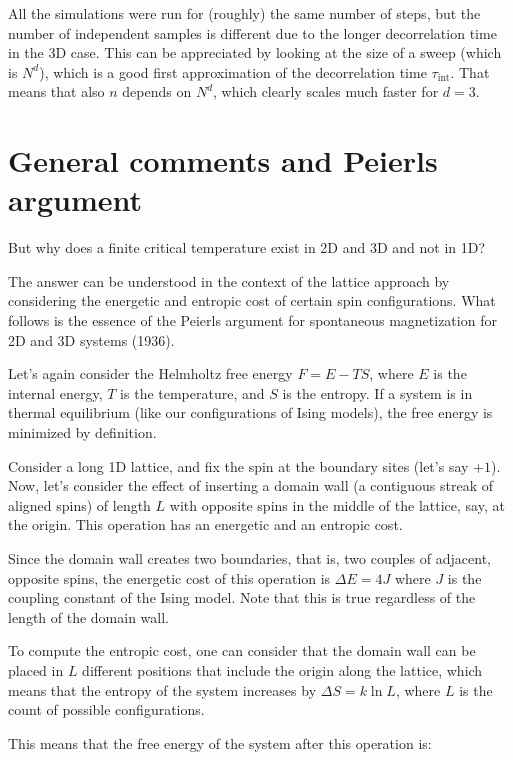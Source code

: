 All the simulations were run for (roughly) the same number of steps, but the number of independent samples is different due to the longer decorrelation time in the 3D case. This can be appreciated by looking at the size of a sweep (which is $N^d$), which is a good first approximation of the decorrelation time $\tau_{\text{int}}$. That means that also $n$ depends on $N^d$, which clearly scales much faster for $d = 3$.

\FloatBarrier

\section{General comments and Peierls argument}

But why does a finite critical temperature exist in 2D and 3D and not in 1D?

The answer can be understood in the context of the lattice approach by considering the energetic and entropic cost of certain spin configurations. What follows is the essence of the Peierls argument for spontaneous magnetization for 2D and 3D systems (1936).

Let's again consider the Helmholtz free energy $F = E - TS$, where $E$ is the internal energy, $T$ is the temperature, and $S$ is the entropy. If a system is in thermal equilibrium (like our configurations of Ising models), the free energy is minimized by definition.

Consider a long 1D lattice, and fix the spin at the boundary sites (let's say $+1$). Now, let's consider the effect of inserting a domain wall (a contiguous streak of aligned spins) of length $L$ with opposite spins in the middle of the lattice, say, at the origin. This operation has an energetic and an entropic cost.

Since the domain wall creates two boundaries, that is, two couples of adjacent, opposite spins, the energetic cost of this operation is $\Delta E = 4J$ where $J$ is the coupling constant of the Ising model. Note that this is true regardless of the length of the domain wall.

To compute the entropic cost, one can consider that the domain wall can be placed in $L$ different positions that include the origin along the lattice, which means that the entropy of the system increases by $\Delta S = k \ln{L}$, where $L$ is the count of possible configurations.

This means that the free energy of the system after this operation is:

